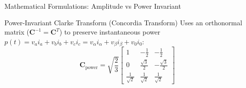 \begin{frame}[allowframebreaks]{Mathematical Formulations: Amplitude vs Power Invariant}
    \begin{block}{Power-Invariant Clarke Transform (Concordia Transform)}
        Uses an orthonormal matrix ($\mathbf{C}^{-1} = \mathbf{C}^T$) to preserve instantaneous power $p(t) = v_a i_a + v_b i_b + v_c i_c = v_\alpha i_\alpha + v_\beta i_\beta + v_0 i_0$:
        \begin{equation}
            \mathbf{C}_{\text{power}}
            =
            \sqrt{\frac{2}{3}}
            \begin{bmatrix}
                1 & -\frac{1}{2} & -\frac{1}{2} \\
                0 & \frac{\sqrt{3}}{2} & -\frac{\sqrt{3}}{2} \\
                \frac{1}{\sqrt{2}} & \frac{1}{\sqrt{2}} & \frac{1}{\sqrt{2}}
            \end{bmatrix}
        \end{equation}
    \end{block}
\end{frame}

